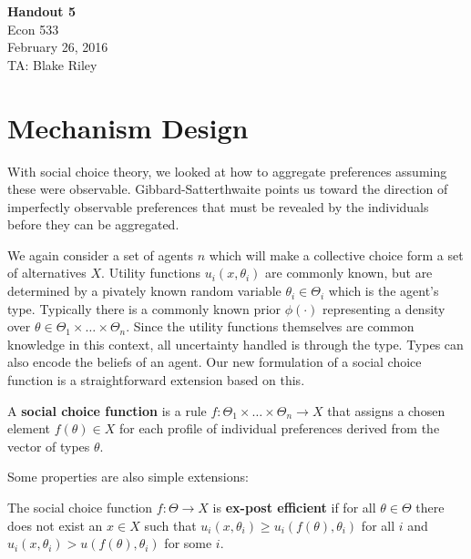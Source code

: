 \documentclass[10pt]{article}
\def\HandoutNumber{5}
\def\TheDate{February 26, 2016}
\def\Name{Blake Riley}
\begin{document}
\begin{spacing}{1.0}

\noindent
\textbf{Handout \HandoutNumber} \\
Econ 533 \\
\TheDate \\
TA: \Name \\

\section{Mechanism Design}

With social choice theory, we looked at how to aggregate preferences
assuming these were observable. Gibbard-Satterthwaite points us toward the
direction of imperfectly observable preferences that must be revealed by
the individuals before they can be aggregated.

\hspace{1em}
We again consider a set of agents $n$ which will make a collective choice
form a set of alternatives $X$. Utility functions $u_i(x, \theta_i)$ are
commonly known, but are determined by a pivately known random variable
$\theta_i \in \Theta_i$ which is the agent's type. Typically there is a
commonly known prior $\phi(\cdot)$ representing a density over $\theta \in
\Theta_1 \times \ldots \times \Theta_n$. Since the utility functions
themselves are common knowledge in this context, all uncertainty handled is
through the type. Types can also encode the beliefs of an agent. Our new
formulation of a social choice function is a straightforward extension
based on this.

\begin{definition}
  A \textbf{social choice function} is a rule $f:
  \Theta_1 \times \ldots \times \Theta_n \to X$ that
  assigns a chosen element $f(\theta) \in X$ for each
  profile of individual preferences derived from the
  vector of types $\theta$.
\end{definition}

Some properties are also simple extensions:

\begin{definition}
  The social choice function $f: \Theta \to X$ is
  \textbf{ex-post efficient} if for all $\theta \in
  \Theta$ there does not exist an $x \in X$ such that
  $u_i(x, \theta_i) \geq u_i(f(\theta), \theta_i)$ for
  all $i$ and $u_i(x, \theta_i) > u(f(\theta), \theta_i)$
  for some $i$.
\end{definition}


\end{spacing}
\end{document}
